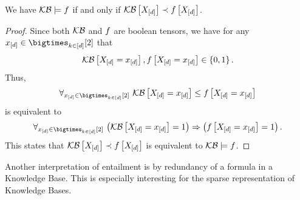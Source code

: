 \begin{theorem}
    \label{the:orderingEntailmentCriterion}
    We have $\mathcal{KB}\models f$ if and only if $\mathcal{KB}\left[X_{[d]}\right]\prec f\left[X_{[d]}\right]$.
\end{theorem}
\begin{proof}
    Since both $\mathcal{KB}$ and $f$ are boolean tensors, we have for any $\shortatomindicesin$ that
    \begin{align*}
        \mathcal{KB}\left[X_{[d]}=x_{[d]}\right],f\left[X_{[d]}=x_{[d]}\right]\in\{0,1\} \, .
    \end{align*}
    Thus,
    \begin{align*}
        \uniquantwrtof{\shortatomindicesin}{\kbat{\indexedshortcatvariables}\leq\formulaat{\indexedshortcatvariables}}
    \end{align*}
    is equivalent to
    \begin{align*}
        \uniquantwrtof{\shortatomindicesin}{\imppremhead{\kbat{\indexedshortcatvariables}=1}{\formulaat{\indexedshortcatvariables}=1}} \, .
    \end{align*}
    This states that $\mathcal{KB}\left[X_{[d]}\right]\prec f\left[X_{[d]}\right]$ is equivalent to $\mathcal{KB}\models f$.
\end{proof}




Another interpretation of entailment is by redundancy of a formula in a Knowledge Base.
This is especially interesting for the sparse representation of Knowledge Bases.

